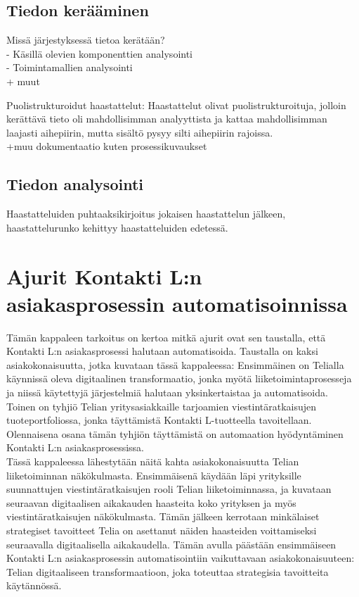 \documentclass[finnish,12pt,a4paper,pdftex]{article}
\begin{document}
\subsection{Tiedon kerääminen}

Missä järjestyksessä tietoa kerätään? \\
- Käsillä olevien komponenttien analysointi\\
- Toimintamallien analysointi\\
+ muut

Puolistrukturoidut haastattelut:  Haastattelut olivat
puolistrukturoituja, jolloin kerättävä tieto oli mahdollisimman analyyttista ja
kattaa mahdollisimman laajasti aihepiirin, mutta sisältö pysyy silti aihepiirin
rajoissa.\\
+muu dokumentaatio kuten prosessikuvaukset


\subsection{Tiedon analysointi}
Haastatteluiden puhtaaksikirjoitus jokaisen haastattelun jälkeen, haastattelurunko kehittyy haastatteluiden edetessä. 


\section{Ajurit Kontakti L:n asiakasprosessin automatisoinnissa}

Tämän kappaleen tarkoitus on kertoa mitkä ajurit ovat sen taustalla, että Kontakti L:n asiakasprosessi halutaan automatisoida. Taustalla on kaksi asiakokonaisuutta, jotka kuvataan tässä kappaleessa: Ensimmäinen on Telialla käynnissä oleva digitaalinen transformaatio, jonka myötä liiketoimintaprosesseja ja niissä käytettyjä järjestelmiä halutaan yksinkertaistaa ja automatisoida. Toinen on tyhjiö Telian yritysasiakkaille tarjoamien viestintäratkaisujen tuoteportfoliossa, jonka täyttämistä Kontakti L-tuotteella tavoitellaan. Olennaisena osana tämän tyhjiön täyttämistä on automaation hyödyntäminen Kontakti L:n asiakasprosessissa.\\

Tässä kappaleessa lähestytään näitä kahta asiakokonaisuutta Telian liiketoiminnan näkökulmasta. Ensimmäisenä käydään läpi yrityksille suunnattujen viestintäratkaisujen rooli Telian liiketoiminnassa, ja kuvataan seuraavan digitaalisen aikakauden haasteita koko yrityksen ja myös viestintäratkaisujen näkökulmasta. Tämän jälkeen kerrotaan minkälaiset strategiset tavoitteet Telia on asettanut näiden haasteiden voittamiseksi seuraavalla digitaalisella aikakaudella. Tämän avulla päästään ensimmäiseen Kontakti L:n asiakasprosessin automatisointiin vaikuttavaan asiakokonaisuuteen: Telian digitaaliseen transformaatioon, joka toteuttaa strategisia tavoitteita käytännössä.\\
\end{document}
